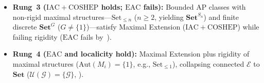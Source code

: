 \documentclass[10pt,twoside,openright]{book}
\theoremstyle{crmplain}
\theoremstyle{crmdef}
\theoremstyle{crmremark}
\begin{document}
\begin{itemize}[leftmargin=1.5em]
  \item \textbf{Rung~3 ($\mathrm{IAC} + \mathrm{COSHEP}$ holds; $\mathrm{EAC}$ fails):} Bounded $\mathrm{AP}$ classes with non-rigid maximal structures---$\mathrm{Set}_{\le n}$ ($n \ge 2$, yielding $\mathbf{Set}^{S_n}$) and finite discrete $\mathbf{Set}^G$ ($G \neq \{1\}$)---satisfy Maximal Extension ($\mathrm{IAC} + \mathrm{COSHEP}$) while failing rigidity ($\mathrm{EAC}$ fails by~\cite[Theorem~6.19]{Kihara26}).
  \item \textbf{Rung~4 ($\mathrm{EAC}$ and localicity hold):} Maximal Extension plus rigidity of maximal structures ($\mathrm{Aut}(M_i) = \{1\}$, e.g., $\mathrm{Set}_{\le 1}$), collapsing connected $\mathcal{E}$ to $\mathbf{Set}$ ($\mathcal{U}(\mathcal{G}) = \{\mathcal{G}\}$, \cite[Theorem~6.19]{Kihara26}).
\end{itemize}
\end{document}
